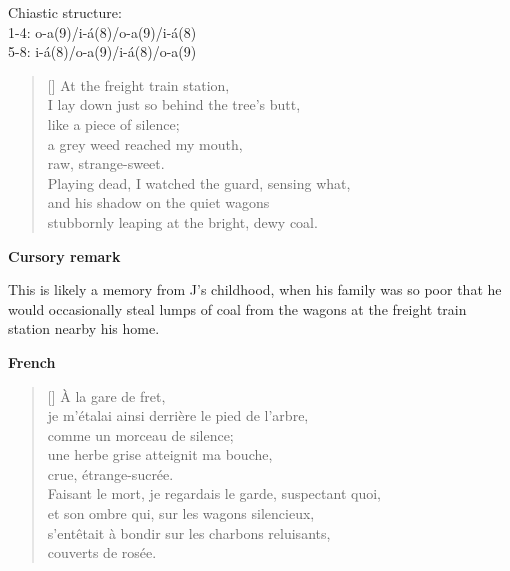 \documentclass[a4paper,12pt,twoside,final]{book}
\begin{document}
\noindent Chiastic structure: \\
1-4: o-a(9)/i-á(8)/o-a(9)/i-á(8) \\
5-8: i-á(8)/o-a(9)/i-á(8)/o-a(9)

\newpage


\settowidth{\versewidth}{stubbornly leaping at the bright, dewy coal.}

\begin{verse}[\versewidth]
  At the freight train station, \\
  I lay down just so behind the tree's butt, \\
  like a piece of silence; \\
  a grey weed reached my mouth, \\
  raw, strange-sweet. \\
  Playing dead, I watched the guard, sensing what, \\
  and his shadow on the quiet wagons \\
  stubbornly leaping at the bright, dewy coal. \\
\end{verse}

\bigskip

\noindent \textbf{Cursory remark}

\medskip

This is likely a memory from J's childhood, when his family was so
poor that he would occasionally steal lumps of coal from the wagons at
the freight train station nearby his home.

\bigskip

\noindent \textbf{French}


\settowidth{\versewidth}{Faisant le mort, je regardais le garde, suspectant quoi,}

\begin{verse}[\versewidth]
  À la gare de fret, \\
  je m'étalai ainsi derrière le pied de l'arbre, \\
  comme un morceau de silence; \\
  une herbe grise atteignit ma bouche, \\
  crue, étrange-sucrée. \\
  Faisant le mort, je regardais le garde, suspectant quoi, \\
  et son ombre qui, sur les wagons silencieux, \\
  s'entêtait à bondir sur les charbons reluisants, \\
  couverts de rosée. \\
\end{verse}
\end{document}
